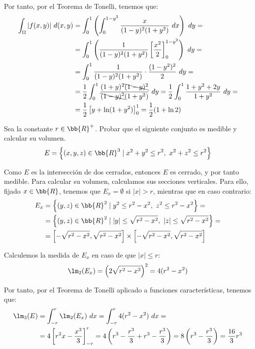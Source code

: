 \begin{ejercicio}
    Por tanto, por el Teorema de Tonelli, tenemos que:
    \begin{align*}
        \int_{\Omega} |f(x, y)|~d(x, y)
        &= \int_0^1 \left( \int_0^{1-y^2} \dfrac{x}{(1-y)^2(1+y^2)}~dx \right)~dy =\\
        &= \int_0^1 \left(\dfrac{1}{(1-y)^2(1+y^2)}\left[ \dfrac{x^2}{2} \right]_0^{1-y^2} \right)~dy =\\
        &= \int_0^1 \dfrac{1}{(1-y)^2(1+y^2)}\cdot \dfrac{(1-y^2)^2}{2}~dy =\\
        &= \dfrac{1}{2}\int_0^1 \dfrac{(1+y)^2\bcancel{(1-y)^2}}{\bcancel{(1-y)^2}(1+y^2)}~dy
        = \dfrac{1}{2}\int_0^1 \dfrac{1+y^2+2y}{1+y^2}~dy =\\
        &= \dfrac{1}{2}\left[ y+\ln(1+y^2) \right]_0^1 = \dfrac{1}{2}(1+\ln 2)
    \end{align*}


\end{ejercicio}


\begin{ejercicio}
    Sea la constante $r\in \bb{R}^+$. Probar que el siguiente conjunto es medible y calcular su volumen.
    \begin{equation*}
        E = \left\{ (x, y, z) \in \bb{R}^3 \mid x^2 + y^2 \leq r^2,~x^2 + z^2 \leq r^2\right\}
    \end{equation*}

    Como $E$ es la intersección de dos cerrados, entonces $E$ es cerrado, y por tanto medible. Para calcular su volumen, calculamos
    sus secciones verticales. Para ello, fijado $x\in \bb{R}$, tenemos que $E_x=\emptyset$ si $|x|>r$, mientras que en caso contrario:
    \begin{align*}
        E_x &= \left\{ (y,z)\in \bb{R}^2 \mid y^2\leq r^2-x^2,~z^2\leq r^2-x^2 \right\} =\\
        &= \left\{ (y,z)\in \bb{R}^2 \mid |y|\leq \sqrt{r^2-x^2},~|z|\leq \sqrt{r^2-x^2} \right\} =\\
        &= \left[ -\sqrt{r^2-x^2}, \sqrt{r^2-x^2} \right]\times \left[ -\sqrt{r^2-x^2}, \sqrt{r^2-x^2} \right]
    \end{align*}

    Calculemos la medida de $E_x$ en caso de que $|x|\leq r$:
    \begin{equation*}
        \lm_2(E_x) = \left( 2\sqrt{r^2-x^2} \right)^2 = 4(r^2-x^2)
    \end{equation*}

    Por tanto, por el Teorema de Tonelli aplicado a funciones características, tenemos que:
    \begin{align*}
        \lm_3(E) &= \int_{-r}^{r} \lm_2(E_x)~dx
        = \int_{-r}^{r} 4(r^2-x^2)~dx =\\
        &= 4\left[ r^2x-\dfrac{x^3}{3} \right]_{-r}^{r}
        = 4\left( r^3-\dfrac{r^3}{3}+r^3-\dfrac{r^3}{3} \right) = 8\left( r^3-\dfrac{r^3}{3} \right) = \dfrac{16}{3}r^3
    \end{align*}
\end{ejercicio}